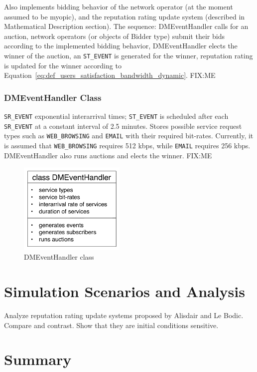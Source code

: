 Also implements bidding behavior of the network operator (at the moment assumed to be myopic), and the reputation rating update system (described in Mathematical Description section). The sequence: DMEventHandler calls for an auction, network operators (or objects of Bidder type) submit their bids according to the implemented bidding behavior, DMEventHandler elects the winner of the auction, an \lstinline{ST_EVENT} is generated for the winner, reputation rating is updated for the winner according to Equation~\eqref{eq:def_users_satisfaction_bandwidth_dynamic}. FIX:ME

\subsubsection{DMEventHandler Class} %
\label{ssub:dmeventhandler_class_dynamic}
\lstinline{SR_EVENT} exponential interarrival times; \lstinline{ST_EVENT} is scheduled after each \lstinline{SR_EVENT} at a constant interval of 2.5 minutes. Stores possible service request types such as \lstinline{WEB_BROWSING} and \lstinline{EMAIL} with their required bit-rates. Currently, it is assumed that \lstinline{WEB_BROWSING} requires 512 kbps, while \lstinline{EMAIL} requires 256 kbps. DMEventHandler also runs auctions and elects the winner. FIX:ME

\begin{figure}[t]
	\includegraphics[width=2in]{3/Figures/dmeventhandler_class}
	\caption{DMEventHandler class}
	\label{fig:dmeventhandler_class_dynamic}
\end{figure}


\section{Simulation Scenarios and Analysis} %
\label{sec:simulation_scenarios_and_analysis_dynamic}
Analyze reputation rating update systems proposed by Alisdair and Le Bodic. Compare and contrast. Show that they are initial conditions sensitive.

\section{Summary} %
\label{sec:summary_dynamic}


